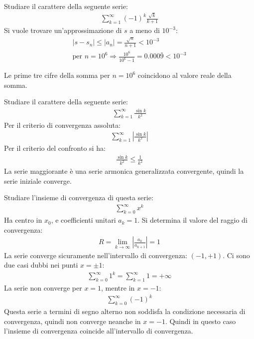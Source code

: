 \documentclass{article}
\numberwithin{equation}{subsection}
\begin{document}
Studiare il carattere della seguente serie:
\begin{gather*}
    \displaystyle\sum_{k=1}^\infty(-1)^k\frac{\sqrt{k}}{k+1}
\end{gather*}
Si vuole trovare un'approssimazione di $s$ a meno di $10^{-3}$:
\begin{gather*}
    |s-s_n|\leq|a_n|=\displaystyle\frac{\sqrt{n}}{n+1}<10^{-3}\\
    \text{per }n=10^6\Rightarrow\frac{10^6}{10^6-1}=0.000\bar{9}<10^{-3}
\end{gather*}

Le prime tre cifre della somma per $n=10^6$ coincidono al valore reale della somma. 




Studiare il carattere della seguente serie:
\begin{gather*}
    \displaystyle\sum_{k=1}^\infty\frac{\sin k}{k^2}
\end{gather*}
Per il criterio di convergenza assoluta:
\begin{gather*}
    \displaystyle\sum_{k=1}^\infty\left|\frac{\sin k}{k^2}\right|
\end{gather*}
Per il criterio del confronto si ha:
\begin{gather*}
    \displaystyle\frac{\sin k}{k^2}\leq\frac{1}{k^2}
\end{gather*}
La serie maggiorante è una serie armonica generalizzata convergente, quindi la serie iniziale converge. 




Studiare l'insieme di convergenza di questa serie:
\begin{gather*}
    \displaystyle\sum_{k=0}^\infty x^k
\end{gather*}
Ha centro in $x_0$, e coefficienti unitari $a_k=1$. Si determina il valore del raggio di convergenza:
\begin{gather*}
    R=\lim_{k\to\infty}\left|\frac{a_k}{{a_{k+1}}}\right|=1
\end{gather*}
La serie converge sicuramente nell'intervallo di convergenza: $(-1,+1)$. Ci sono due casi dubbi nei punti $x=\pm1$:
\begin{gather*}
    \displaystyle\sum_{k=0}^\infty 1^k=\sum_{k=1}^\infty1=+\infty
\end{gather*}
La serie non converge per $x=1$, mentre in $x=-1$:
\begin{gather*}
    \displaystyle\sum_{k=0}^\infty (-1)^k
\end{gather*}
Questa serie a termini di segno alterno non soddisfa la condizione necessaria di convergenza, quindi non converge neanche in $x=-1$. 
Quindi in questo caso l'insieme di convergenza coincide all'intervallo di convergenza. 
\end{document}
